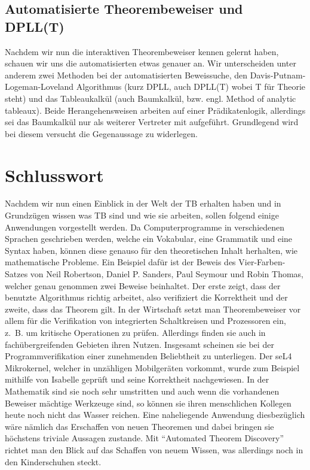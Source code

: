 \subsection{Automatisierte Theorembeweiser und DPLL(T)}
Nachdem wir nun die interaktiven Theorembeweiser kennen gelernt haben, schauen
wir uns die automatisierten etwas genauer an.
Wir unterscheiden unter anderem
zwei Methoden bei der automatisierten Beweissuche, den Davis-Putnam-Logeman-Loveland Algorithmus (kurz DPLL, auch DPLL(T) wobei T für Theorie steht) und das
Tableaukalkül (auch Baumkalkül, bzw. engl. Method of analytic tableaux).
Beide Herangehensweisen arbeiten auf einer Prädikatenlogik, allerdings sei das Baumkalkül
nur als weiterer Vertreter mit aufgeführt.
Grundlegend wird bei diesem versucht die
 Gegenaussage zu widerlegen.


\section{Schlusswort}
Nachdem wir nun einen Einblick in der Welt der TB erhalten haben und in Grundzügen wissen was TB sind und wie sie arbeiten, sollen folgend einige Anwendungen vorgestellt werden.
Da Computerprogramme in verschiedenen Sprachen geschrieben werden, welche ein Vokabular, eine Grammatik und eine Syntax haben, können diese genauso für den theoretischen Inhalt herhalten, wie mathematische Probleme.
Ein Beispiel dafür ist der Beweis des Vier-Farben-Satzes von Neil Robertson, Daniel P. Sanders, Paul Seymour und Robin Thomas, welcher genau genommen zwei Beweise beinhaltet.
Der erste zeigt, dass der benutzte Algorithmus richtig arbeitet, also verifiziert die Korrektheit und der zweite, dass das Theorem gilt.
In der Wirtschaft setzt man Theorembeweiser vor allem für die Verifikation von integrierten Schaltkreisen und Prozessoren ein, z.~B. um kritische Operationen zu prüfen.
Allerdings finden sie auch in fachübergreifenden Gebieten ihren Nutzen. Insgesamt scheinen sie bei der Programmverifikation einer zunehmenden Beliebtheit zu unterliegen.
Der seL4 Mikrokernel, welcher in unzähligen Mobilgeräten vorkommt, wurde zum Beispiel mithilfe von Isabelle geprüft und seine Korrektheit nachgewiesen.
In der Mathematik sind sie noch sehr umstritten und auch wenn die vorhandenen Beweiser mächtige Werkzeuge sind, so können sie ihren menschlichen Kollegen heute noch nicht das Wasser reichen.
Eine naheliegende Anwendung diesbezüglich wäre nämlich das Erschaffen von neuen Theoremen und dabei bringen sie höchstens triviale Aussagen zustande.
Mit \enquote{Automated Theorem Discovery}~\cite{Gao2014} richtet man den Blick auf das Schaffen von neuem Wissen, was allerdings noch in den Kinderschuhen steckt.
